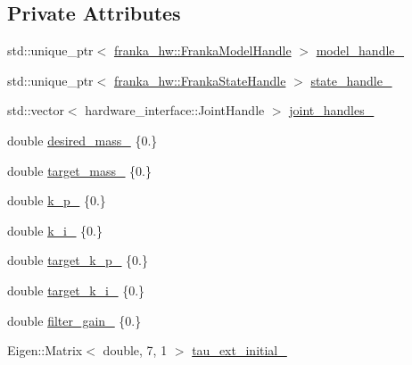 \subsection*{Private Attributes}
\begin{DoxyCompactItemize}
\item 
std\+::unique\+\_\+ptr$<$ \hyperlink{classfranka__hw_1_1FrankaModelHandle}{franka\+\_\+hw\+::\+Franka\+Model\+Handle} $>$ \hyperlink{classfranka__example__controllers_1_1ForceExampleController_a97bc82b7bea28c31389b857f25adbe47}{model\+\_\+handle\+\_\+}
\item 
std\+::unique\+\_\+ptr$<$ \hyperlink{classfranka__hw_1_1FrankaStateHandle}{franka\+\_\+hw\+::\+Franka\+State\+Handle} $>$ \hyperlink{classfranka__example__controllers_1_1ForceExampleController_a4b932a6c22504e9728c57b5fa7ccd620}{state\+\_\+handle\+\_\+}
\item 
std\+::vector$<$ hardware\+\_\+interface\+::\+Joint\+Handle $>$ \hyperlink{classfranka__example__controllers_1_1ForceExampleController_aed2074f77427deafe9b8670430f5a760}{joint\+\_\+handles\+\_\+}
\item 
double \hyperlink{classfranka__example__controllers_1_1ForceExampleController_a5141239dda158063dc67d47aa74c2a3e}{desired\+\_\+mass\+\_\+} \{0.\}
\item 
double \hyperlink{classfranka__example__controllers_1_1ForceExampleController_a351793b041d57afb712be67410821cdc}{target\+\_\+mass\+\_\+} \{0.\}
\item 
double \hyperlink{classfranka__example__controllers_1_1ForceExampleController_a2f3c9fae22264a5a80da0d00e617bdf1}{k\+\_\+p\+\_\+} \{0.\}
\item 
double \hyperlink{classfranka__example__controllers_1_1ForceExampleController_a1a120dff4babea15e1d5a866547cd13a}{k\+\_\+i\+\_\+} \{0.\}
\item 
double \hyperlink{classfranka__example__controllers_1_1ForceExampleController_ae5b17c481b7c7acebb8f378e29bf6b77}{target\+\_\+k\+\_\+p\+\_\+} \{0.\}
\item 
double \hyperlink{classfranka__example__controllers_1_1ForceExampleController_ae4636481a611830a438a2b49ccb05f17}{target\+\_\+k\+\_\+i\+\_\+} \{0.\}
\item 
double \hyperlink{classfranka__example__controllers_1_1ForceExampleController_a213ed677004316d1b790794f03aa0a7a}{filter\+\_\+gain\+\_\+} \{0.\}
\item 
Eigen\+::\+Matrix$<$ double, 7, 1 $>$ \hyperlink{classfranka__example__controllers_1_1ForceExampleController_a5de4c22bd3d9d27f039f33f0c10fa11f}{tau\+\_\+ext\+\_\+initial\+\_\+}

\end{DoxyCompactItemize}
